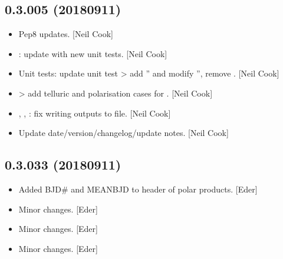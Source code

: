 \documentclass[a4paper,10pt,english]{report}
\begin{document}
\subsection{0.3.005 (2018\sphinxhyphen{}09\sphinxhyphen{}11)}
\label{\detokenize{misc/changelog:id347}}\begin{itemize}
\item {} 
Pep8 updates. {[}Neil Cook{]}

\item {} 
: update with new unit tests. {[}Neil Cook{]}

\item {} 
Unit tests: update unit test \textendash{}\textgreater{} add ” and modify
”, remove . {[}Neil Cook{]}

\item {} 
 \textendash{}\textgreater{} add telluric and polarisation cases for
. {[}Neil Cook{]}

\item {} 
, , : fix writing outputs
to file. {[}Neil Cook{]}

\item {} 
Update date/version/changelog/update notes. {[}Neil Cook{]}

\end{itemize}


\subsection{0.3.033 (2018\sphinxhyphen{}09\sphinxhyphen{}11)}
\label{\detokenize{misc/changelog:id348}}\begin{itemize}
\item {} 
Added BJD\# and MEANBJD to header of polar products. {[}Eder{]}

\item {} 
Minor changes. {[}Eder{]}

\item {} 
Minor changes. {[}Eder{]}

\item {} 
Minor changes. {[}Eder{]}

\end{itemize}
\end{document}
